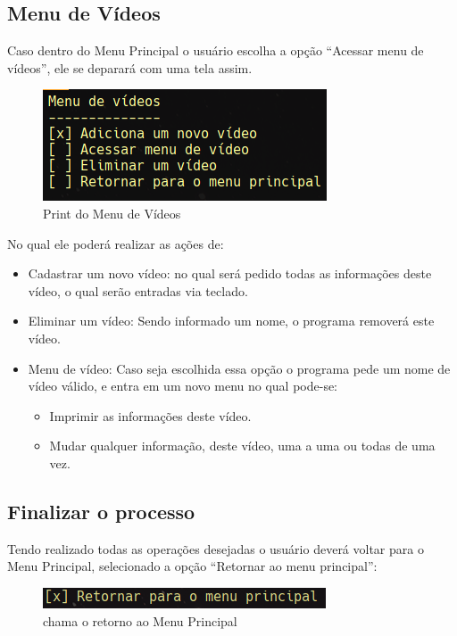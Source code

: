 \documentclass[12pt, a4paper]{article}
\begin{document}
\subsection{Menu de Vídeos}
Caso dentro do Menu Principal o usuário escolha a opção “Acessar menu de vídeos”, ele se deparará com uma tela assim.

\begin{figure}[!htb]
	\centering
	\includegraphics[keepaspectratio]{MenuVideo.png}
	\caption{\label{fig:MenuVideo.png} Print do Menu de Vídeos}
\end{figure}
No qual ele poderá realizar as ações de:
\begin{itemize}
	\item Cadastrar um novo vídeo: no qual será pedido todas as informações deste vídeo, o qual serão entradas via teclado.
	\item Eliminar um vídeo: Sendo informado um nome, o programa removerá este vídeo.
	\item Menu de vídeo: Caso seja escolhida essa opção o programa pede um nome de vídeo válido, e entra em um novo menu no qual pode-se:
		\begin{itemize}
			\item Imprimir as informações deste vídeo.
			\item Mudar qualquer informação, deste vídeo, uma a uma ou todas de uma vez.
		\end{itemize}
\end{itemize}

\clearpage
\subsection{Finalizar o processo}

Tendo realizado todas as operações desejadas o usuário deverá voltar para o Menu Principal, selecionado a opção ``Retornar ao menu principal'':

\begin{figure}[!htb]
	\centering
	\includegraphics[keepaspectratio]{Retornar.png}
	\caption{\label{fig:Retornar.png} chama o retorno ao Menu Principal}
\end{figure}
\end{document}
